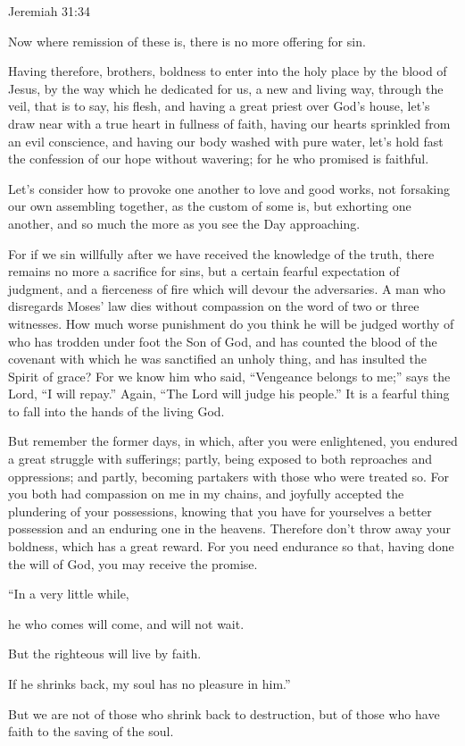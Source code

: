 {{Jeremiah 31:34}
\par }{\PP {}Now where remission of these is, there is no more offering for sin.
\par }{\PP {}Having therefore, brothers, boldness to enter into the holy place by the blood of Jesus,
by the way which he dedicated for us, a new and living way, through the veil, that is to say, his flesh,
and having a great priest over God’s house,
let’s draw near with a true heart in fullness of faith, having our hearts sprinkled from an evil conscience, and having our body washed with pure water,
let’s hold fast the confession of our hope without wavering; for he who promised is faithful.
\par }{\PP {}Let’s consider how to provoke one another to love and good works,
not forsaking our own assembling together, as the custom of some is, but exhorting one another, and so much the more as you see the Day approaching.
\par }{\PP {}For if we sin willfully after we have received the knowledge of the truth, there remains no more a sacrifice for sins,
but a certain fearful expectation of judgment, and a fierceness of fire which will devour the adversaries.
A man who disregards Moses’ law dies without compassion on the word of two or three witnesses.
How much worse punishment do you think he will be judged worthy of who has trodden under foot the Son of God, and has counted the blood of the covenant with which he was sanctified an unholy thing, and has insulted the Spirit of grace?
For we know him who said, “Vengeance belongs to me;” says the Lord, “I will repay.” Again, “The Lord will judge his people.”
It is a fearful thing to fall into the hands of the living God.
\par }{\PP {}But remember the former days, in which, after you were enlightened, you endured a great struggle with sufferings;
partly, being exposed to both reproaches and oppressions; and partly, becoming partakers with those who were treated so.
For you both had compassion on me in my chains, and joyfully accepted the plundering of your possessions, knowing that you have for yourselves a better possession and an enduring one in the heavens.
Therefore don’t throw away your boldness, which has a great reward.
For you need endurance so that, having done the will of God, you may receive the promise.
\par }{\Q {}“In a very little while,
\par }{\QB he who comes will come, and will not wait.
\par }{\Q {}But the righteous will live by faith.
\par }{\QB If he shrinks back, my soul has no pleasure in him.”
\par }{\PP {}But we are not of those who shrink back to destruction, but of those who have faith to the saving of the soul.

}
